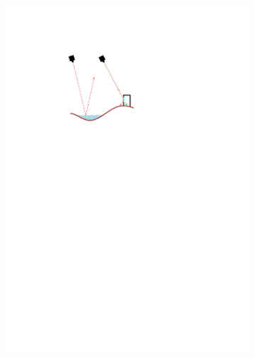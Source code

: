 \begin{figure}
	\centering
	\begin{subfigure}{0.4\linewidth}
		\includegraphics[width=\textwidth,page=2]{figs/lidarAcq.pdf}
		\label{fig:lidarAcquisitionConditions:a}
	\end{subfigure}
	\quad
	\begin{subfigure}{0.3\linewidth}

\end{subfigure}
\end{figure}
